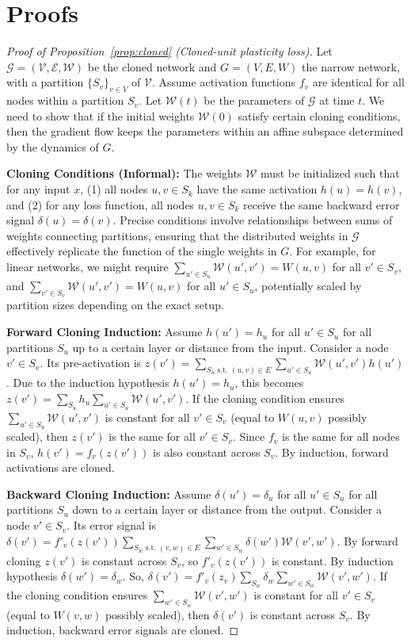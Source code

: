 \documentclass{article}
\begin{document}
\section{Proofs}
\label{app:proofs}

\begin{proof}[Proof of Proposition~\ref{prop:cloned} (Cloned-unit plasticity loss)]
    Let $\mathcal{G}=(\mathcal{V},\mathcal{E},\mathcal{W})$ be the cloned network and $G=(V,E,W)$ the narrow network, with a partition $\{S_v\}_{v\in V}$ of $\mathcal{V}$. Assume activation functions $f_v$ are identical for all nodes within a partition $S_v$. Let $\mathcal{W}(t)$ be the parameters of $\mathcal{G}$ at time $t$. We need to show that if the initial weights $\mathcal{W}(0)$ satisfy certain cloning conditions, then the gradient flow keeps the parameters within an affine subspace determined by the dynamics of $G$.

    \textbf{Cloning Conditions (Informal):} The weights $\mathcal{W}$ must be initialized such that for any input $x$, (1) all nodes $u, v \in S_k$ have the same activation $h(u)=h(v)$, and (2) for any loss function, all nodes $u, v \in S_k$ receive the same backward error signal $\delta(u)=\delta(v)$. Precise conditions involve relationships between sums of weights connecting partitions, ensuring that the distributed weights in $\mathcal{G}$ effectively replicate the function of the single weights in $G$. For example, for linear networks, we might require $\sum_{u' \in S_u} \mathcal{W}(u', v') = W(u,v)$ for all $v' \in S_v$, and $\sum_{v' \in S_v} \mathcal{W}(u', v') = W(u,v)$ for all $u' \in S_u$, potentially scaled by partition sizes depending on the exact setup.

    \textbf{Forward Cloning Induction:} Assume $h(u') = h_u$ for all $u' \in S_u$ for all partitions $S_u$ up to a certain layer or distance from the input. Consider a node $v' \in S_v$. Its pre-activation is $z(v') = \sum_{S_u \text{ s.t. } (u,v)\in E} \sum_{u' \in S_u} \mathcal{W}(u', v') h(u')$. Due to the induction hypothesis $h(u')=h_u$, this becomes $z(v') = \sum_{S_u} h_u \sum_{u' \in S_u} \mathcal{W}(u', v')$. If the cloning condition ensures $\sum_{u' \in S_u} \mathcal{W}(u', v')$ is constant for all $v' \in S_v$ (equal to $W(u,v)$ possibly scaled), then $z(v')$ is the same for all $v' \in S_v$. Since $f_v$ is the same for all nodes in $S_v$, $h(v') = f_v(z(v'))$ is also constant across $S_v$. By induction, forward activations are cloned.

    \textbf{Backward Cloning Induction:} Assume $\delta(u') = \delta_u$ for all $u' \in S_u$ for all partitions $S_u$ down to a certain layer or distance from the output. Consider a node $v' \in S_v$. Its error signal is $\delta(v') = f'_v(z(v')) \sum_{S_w \text{ s.t. } (v,w)\in E} \sum_{w' \in S_w} \delta(w') \mathcal{W}(v', w')$. By forward cloning $z(v')$ is constant across $S_v$, so $f'_v(z(v'))$ is constant. By induction hypothesis $\delta(w')=\delta_w$. So, $\delta(v') = f'_v(z_v) \sum_{S_w} \delta_w \sum_{w' \in S_w} \mathcal{W}(v', w')$. If the cloning condition ensures $\sum_{w' \in S_w} \mathcal{W}(v', w')$ is constant for all $v' \in S_v$ (equal to $W(v,w)$ possibly scaled), then $\delta(v')$ is constant across $S_v$. By induction, backward error signals are cloned.


\end{proof}
\end{document}
